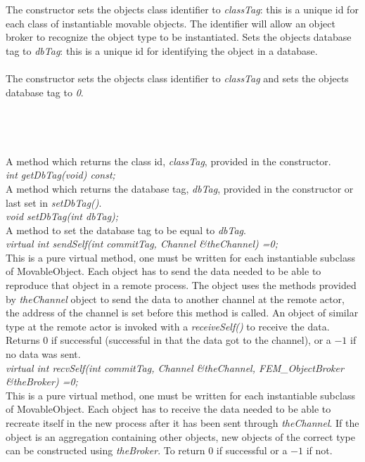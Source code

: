  \\
  \\
The constructor sets the objects class identifier to {\em classTag}:
this is a unique id for each class of instantiable movable
objects. The identifier will allow an object broker to recognize the
object type to be instantiated. Sets the objects database tag to {\em
dbTag}: this is a unique id for identifying the object in a database. \\


  \\
The constructor sets the objects class identifier to {\em classTag} 
and sets the objects database tag to {\em 0}. \\

 \\
\\ 

  \\
\\
A method which returns the class id, {\em classTag}, provided in
the constructor. \\

{\em int getDbTag(void) const;}\\
A method which returns the database tag, {\em dbTag}, provided in
the constructor or last set in {\em setDbTag()}. \\

{\em void setDbTag(int dbTag);}\\
A method to set the database tag to be equal to {\em dbTag}. \\

{\em virtual int sendSelf(int commitTag, Channel \&theChannel) =0;} \\ 
This is a pure virtual method, one must be written for each
instantiable subclass of MovableObject. Each object has to send the
data needed to be able to reproduce that object in a remote
process. The object uses the methods provided by {\em theChannel}
object to send the data to another channel at the remote actor, the
address of the channel is set before this method is called.
An object of similar type at the remote actor is invoked with a  {\em
receiveSelf()} to receive the data. Returns $0$ if successful
(successful in that the data got to the channel), or a $-1$ if no
data was sent. \\  

{\em virtual int recvSelf(int commitTag, Channel \&theChannel, FEM\_ObjectBroker
\&theBroker) =0;} \\ 
This is a pure virtual method, one must be written for each
instantiable subclass of MovableObject. Each object has to receive the
data needed to be able to recreate itself in the new process after it
has been sent through {\em theChannel}. If the object is an
aggregation containing other objects, new objects of the correct type
can be constructed using {\em theBroker}. To return $0$ if successful
or a $-1$ if not. \\




